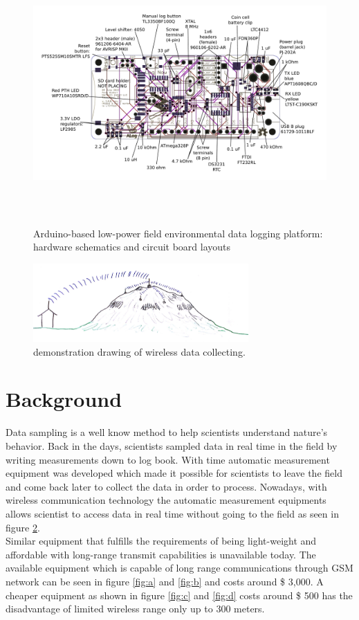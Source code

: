 \begin{figure}
\centering
\includegraphics[height=10cm]{graphics/ALog_drawing}
\caption{Arduino-based low-power field environmental data logging platform: hardware schematics and circuit board layouts\label{fig:BottleLog}\cite{ALog-BottleLogger}}
\end{figure}

\begin{figure}
		\centering
        \includegraphics[height=3cm]{graphics/GeoLog.PNG}
        \caption{demonstration drawing of wireless data collecting.}
        \label{fig:datalogging}
\end{figure}
\section{Background}
Data sampling is a well know method to help scientists understand nature's behavior. Back in the days, scientists sampled data in real time in the field by writing measurements down to log book. With time automatic measurement equipment was developed which made it possible for scientists to leave the field and come back later to collect the data in order to process. Nowadays, with wireless communication technology the automatic measurement equipments allows scientist to access data in real time without going to the field as seen in figure \ref{fig:datalogging}.\\
Similar equipment that fulfills the requirements of being light-weight and affordable with long-range transmit capabilities is unavailable today. The available equipment which is capable of long range communications through GSM network can be seen in figure \ref{fig:a} and \ref{fig:b} and costs around \$ 3,000. A cheaper equipment as shown in figure \ref{fig:c} and  \ref{fig:d} costs around \$ 500 has the disadvantage of limited wireless range only up to 300 meters.

